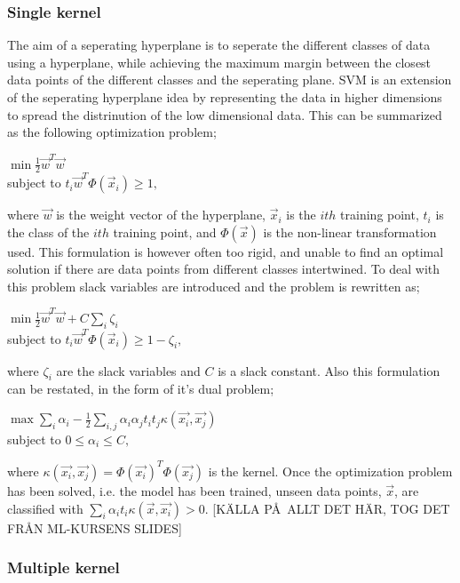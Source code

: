 \documentclass{article}
\begin{document}
\subsubsection{Single kernel}
The aim of a seperating hyperplane is to seperate the different classes of data using a hyperplane, while achieving the maximum margin between the closest data points of the different classes and the seperating plane. SVM is an extension of the seperating hyperplane idea by representing the data in higher dimensions to spread the distrinution of the low dimensional data. This can be summarized as the following optimization problem;
\begin{center}
$\min \frac{1}{2}\vec{w}^{T}\vec{w}$ \\
subject to $t_i \vec{w}^{T} \Phi(\vec{x}_i)  \geq 1, $
\end{center}
where $\vec{w}$ is the weight vector of the hyperplane, $\vec{x}_i$ is the $ith$ training point, $t_i$ is the class of the $ith$ training point, and $\Phi(\vec{x})$ is the non-linear transformation used. This formulation is however often too rigid, and unable to find an optimal solution if there are data points from different classes intertwined. To deal with this problem slack variables are introduced and the problem is rewritten as;
\begin{center}
$\min \frac{1}{2}\vec{w}^{T}\vec{w} + C\sum\limits_i \zeta_i $ \\
subject to $t_i \vec{w}^{T} \Phi(\vec{x}_i)  \geq 1 - \zeta_i, $
\end{center}
where $\zeta_i$ are the slack variables and $C$ is a slack constant. Also this formulation can be restated, in the form of it's dual problem;

\begin{center}
$\max \sum\limits_i \alpha_i - \frac{1}{2}\sum\limits_{i,j} \alpha_i \alpha_j t_i t_j \kappa (\vec{x_i}, \vec{x_j})$ \\
subject to $0 \leq \alpha_i \leq C, $
\end{center}
where $\kappa (\vec{x_i}, \vec{x_j}) = \Phi(\vec{x_i})^T \Phi(\vec{x_j})$ is the kernel. Once the optimization problem has been solved, i.e. the model has been trained, unseen data points, $\vec{x}$,  are classified with $\sum\limits_i \alpha_i t_i \kappa(\vec{x},\vec{x_i}) > 0$. [K\"ALLA P\AA\ ALLT DET H\"AR, TOG DET FR\AA N ML-KURSENS SLIDES]

\subsubsection{Multiple kernel}
\end{document}
